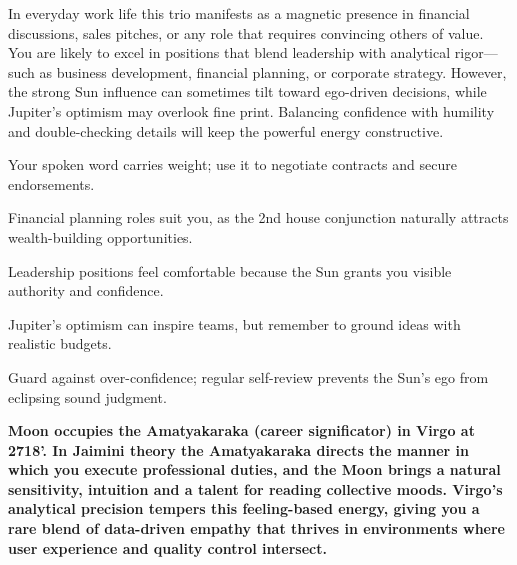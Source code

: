 {\fontsize{9}{13}\selectfont In everyday work life this trio manifests as a magnetic presence in financial discussions, sales pitches, or any role that requires convincing others of value. You are likely to excel in positions that blend leadership with analytical rigor---such as business development, financial planning, or corporate strategy. However, the strong Sun influence can sometimes tilt toward ego-driven decisions, while Jupiter's optimism may overlook fine print. Balancing confidence with humility and double-checking details will keep the powerful energy constructive.}\par\vspace{1.8mm}

\begin{diamondlist}
  \item {\fontsize{8.5}{12}\selectfont Your spoken word carries weight; use it to negotiate contracts and secure endorsements.}
  \item {\fontsize{8.5}{12}\selectfont Financial planning roles suit you, as the 2nd house conjunction naturally attracts wealth-building opportunities.}
  \item {\fontsize{8.5}{12}\selectfont Leadership positions feel comfortable because the Sun grants you visible authority and confidence.}
  \item {\fontsize{8.5}{12}\selectfont Jupiter's optimism can inspire teams, but remember to ground ideas with realistic budgets.}
  \item {\fontsize{8.5}{12}\selectfont Guard against over-confidence; regular self-review prevents the Sun's ego from eclipsing sound judgment.}
\end{diamondlist}


\label{topic24}

{\fontsize{9.5}{13.8}\selectfont\bfseries\color{DeepSlate} Moon occupies the Amatyakaraka (career significator) in Virgo at 27\textdegree{}18'. In Jaimini theory the Amatyakaraka directs the manner in which you execute professional duties, and the Moon brings a natural sensitivity, intuition and a talent for reading collective moods. Virgo's analytical precision tempers this feeling-based energy, giving you a rare blend of data-driven empathy that thrives in environments where user experience and quality control intersect.}\par\vspace{2mm}

